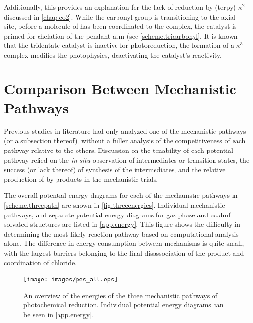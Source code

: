Additionally, this provides an explanation for the lack of  reduction by (terpy)-$\kappa^2$- discussed in \autoref{chap.co2}. While the carbonyl group is transitioning to the axial site, before a molecule of  has been coordinated to the complex, the catalyst is primed for chelation of the pendant arm (see \autoref{scheme.tricarbonyl}. It is known that the tridentate catalyst is inactive for  photoreduction, the formation of a $\kappa^3$ complex modifies the photophysics, deactivating the catalyst's reactivity.

\FloatBarrier

\section{Comparison Between Mechanistic Pathways} \label{sec.compare}

Previous studies in literature had only analyzed one of the mechanistic pathways (or a subsection thereof), without a fuller analysis of the competitiveness of each pathway relative to the others. Discussion on the tenability of each potential pathway relied on the \textit{in situ} observation of intermediates or transition states, the success (or lack thereof) of synthesis of the intermediates, and the relative production of by-products in the mechanistic trials. 

The overall potential energy diagrams for each of the mechanistic pathways in \autoref{scheme.threepath} are shown in \autoref{fig.threeenergies}. Individual mechanistic pathways, and separate potential energy diagrams for gas phase and \gls{ac.dmf} solvated structures are listed in \autoref{app.energy}. This figure shows the difficulty in determining the most likely reaction pathway based on computational analysis alone. The difference in energy consumption between mechanisms is quite small, with the largest barriers belonging to the final disassociation of the product and coordination of chloride. 

\begin{figure}[!htbp]
 \begin{center}
  \texttt{[image: images/pes\_all.eps]}
 \end{center}
\caption[Potential energy diagram for three mechanistic pathways]{An overview of the energies of the three mechanistic pathways of photochemical  reduction. Individual potential energy diagrams can be seen in \autoref{app.energy}.}
\label{fig.threeenergies}
\end{figure} 

